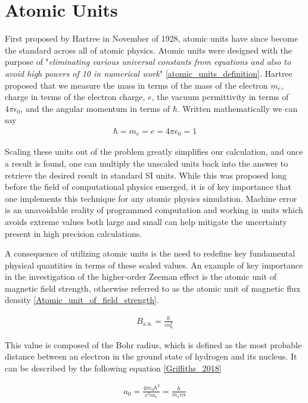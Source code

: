     \section{Atomic Units} \label{sec:atomic_units}    
        First proposed by Hartree in November of 1928, atomic units have since become the standard across all of atomic physics. Atomic units were designed with the purpose of "\textit{eliminating various universal constants from equations and also to avoid high powers of 10 in numerical work}" \ref{atomic_units_definition}. Hartree proposed that we measure the mass in terms of the mass of the electron $m_e$, charge in terms of the electron charge, $e$, the vacuum permittivity in terms of $4\pi \epsilon_0$, and the angular momentum in terms of $\hbar$. Written mathematically we can say
        \begin{align}
            \hbar = m_e = e = 4\pi \epsilon_0 = 1
        \end{align}

        \noindent Scaling these units out of the problem greatly simplifies our calculation, and once a result is found, one can multiply the unscaled units back into the answer to retrieve the desired result in standard SI units. While this was proposed long before the field of computational physics emerged, it is of key importance that one implements this technique for any atomic physics simulation. Machine error is an unavoidable reality of programmed computation and working in units which avoids extreme values both large and small can help mitigate the uncertainty present in high precision calculations.

        A consequence of utilizing atomic units is the need to redefine key fundamental physical quantities in terms of these scaled values. An example of key importance in the investigation of the higher-order Zeeman effect is the atomic unit of magnetic field strength, otherwise referred to as the atomic unit of magnetic flux density \ref{Atomic_unit_of_field_strength}.

        \begin{align}
            B_{\text{a.u.}} = \frac{\hbar}{e a_0^2}
        \end{align}

        This value is composed of the Bohr radius, which is defined as the most probable distance between an electron in the ground state of hydrogen and its nucleus. It can be described by the following equation \ref{Griffiths_2018}

        \begin{align}
            a_0 = \frac{4\pi \epsilon_0 \hbar^2}{e^2 m_e} = \frac{\hbar}{m_e c \alpha} \label{eq:bohr_radius}
        \end{align}

